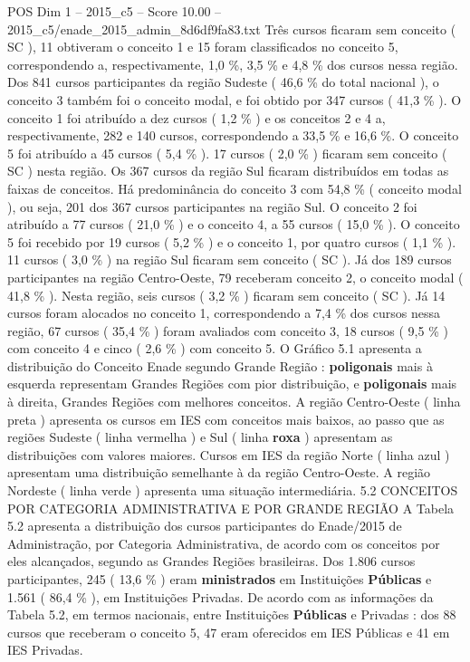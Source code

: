\begin{textsample}{POS Dim 1 – 2015\_c5 – Score 10.00 – 2015\_c5/enade\_2015\_admin\_8d6df9fa83.txt}
Três cursos ficaram sem conceito ( SC ), 11 obtiveram o conceito 1 e 15 foram classificados no conceito 5, correspondendo a, respectivamente, 1,0 \%, 3,5 \% e 4,8 \% dos cursos nessa região.
Dos 841 cursos participantes da região Sudeste ( 46,6 \% do total nacional ), o conceito 3 também foi o conceito modal, e foi obtido por 347 cursos ( 41,3 \% ).
O conceito 1 foi atribuído a dez cursos ( 1,2 \% ) e os conceitos 2 e 4 a, respectivamente, 282 e 140 cursos, correspondendo a 33,5 \% e 16,6 \%.
O conceito 5 foi atribuído a 45 cursos ( 5,4 \% ). 17 cursos ( 2,0 \% ) ficaram sem conceito ( SC ) nesta região.
Os 367 cursos da região Sul ficaram distribuídos em todas as faixas de conceitos.
Há predominância do conceito 3 com 54,8 \% ( conceito modal ), ou seja, 201 dos 367 cursos participantes na região Sul.
O conceito 2 foi atribuído a 77 cursos ( 21,0 \% ) e o conceito 4, a 55 cursos ( 15,0 \% ).
O conceito 5 foi recebido por 19 cursos ( 5,2 \% ) e o conceito 1, por quatro cursos ( 1,1 \% ). 11 cursos ( 3,0 \% ) na região Sul ficaram sem conceito ( SC ).
Já dos 189 cursos participantes na região Centro-Oeste, 79 receberam conceito 2, o conceito modal ( 41,8 \% ).
Nesta região, seis cursos ( 3,2 \% ) ficaram sem conceito ( SC ).
Já 14 cursos foram alocados no conceito 1, correspondendo a 7,4 \% dos cursos nessa região, 67 cursos ( 35,4 \% ) foram avaliados com conceito 3, 18 cursos ( 9,5 \% ) com conceito 4 e cinco ( 2,6 \% ) com conceito 5.
O Gráfico 5.1 apresenta a distribuição do Conceito Enade segundo Grande Região : \textbf{poligonais} mais à esquerda representam Grandes Regiões com pior distribuição, e \textbf{poligonais} mais à direita, Grandes Regiões com melhores conceitos.
A região Centro-Oeste ( linha preta ) apresenta os cursos em IES com conceitos mais baixos, ao passo que as regiões Sudeste ( linha vermelha ) e Sul ( linha \textbf{roxa} ) apresentam as distribuições com valores maiores.
Cursos em IES da região Norte ( linha azul ) apresentam uma distribuição semelhante à da região Centro-Oeste.
A região Nordeste ( linha verde ) apresenta uma situação intermediária. 5.2 CONCEITOS POR CATEGORIA ADMINISTRATIVA E POR GRANDE REGIÃO A Tabela 5.2 apresenta a distribuição dos cursos participantes do Enade/2015 de Administração, por Categoria Administrativa, de acordo com os conceitos por eles alcançados, segundo as Grandes Regiões brasileiras.
Dos 1.806 cursos participantes, 245 ( 13,6 \% ) eram \textbf{ministrados} em Instituições \textbf{Públicas} e 1.561 ( 86,4 \% ), em Instituições Privadas.
De acordo com as informações da Tabela 5.2, em termos nacionais, entre Instituições \textbf{Públicas} e Privadas : dos 88 cursos que receberam o conceito 5, 47 eram oferecidos em IES Públicas e 41 em IES Privadas.

\end{textsample}
